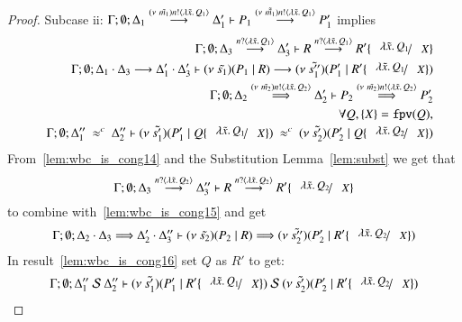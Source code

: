 \begin{proof}
	\noi Subcase ii: $\Gamma; \emptyset; \Delta_1 \stackrel{(\nu\ \tilde{m_1}) n ! \langle \lambda \tilde{x}.\,Q_1 \rangle}{\longrightarrow} \Delta_1' \vdash P_1 \stackrel{(\nu\ \tilde{\tilde{m_1}}) n ! \langle \lambda \tilde{x}.\,Q_1 \rangle}{\longrightarrow} P_1'$ implies
%
	\begin{eqnarray}
		& & \Gamma; \emptyset; \Delta_3 \by{\bactinp{n}{\abs{\tilde{x}} {Q_1}}} \Delta_3' \proves R \by{\bactinp{n}{\abs{\tilde{x}} {Q_1}}} R' \subst{\abs{\tilde{x}}{Q_1}}{X}
		\label{lem:wbc_is_cong14}\\
		& & \Gamma; \emptyset; \Delta_1 \cat \Delta_3 \by{} \Delta_1' \cat \Delta_3' \proves \newsp{\tilde{s_1}}{P_1 \Par R} \by{} \newsp{\tilde{s_1''}}{P_1' \Par R' \subst{\abs{\tilde{x}}{Q_1}}{X}} \nonumber \\
		& & \Gamma; \emptyset; \Delta_2\By{\news{\tilde{m_2}} \bactout{n}{\abs{\tilde{x}}{Q_2}}} \Delta_2' \proves P_2 \By{\news{\tilde{m_2}} \bactout{n}{\abs{\tilde{x}}{Q_2}}} P_2'
		\label{lem:wbc_is_cong15}\\
		& & \forall Q, \set{X} = \fpv{Q}, \nonumber \\
		& & \Gamma; \emptyset; \Delta_1''\ \wbc\ \Delta_2'' \proves \newsp{\tilde{s_1'}}{P_1' \Par Q \subst{\abs{\tilde{x}}{Q_1}}{X}}\ \wbc\ \newsp{\tilde{s_2'}}{P_2' \Par Q \subst{\abs{\tilde{x}}{Q_2}}{X}} \label{lem:wbc_is_cong16}
	\end{eqnarray}
%
	From~\ref{lem:wbc_is_cong14} and the Substitution Lemma~\ref{lem:subst} we get that
	\[
		\Gamma; \emptyset; \Delta_3 \by{\bactinp{n}{\abs{\tilde{x}} {Q_2}}} \Delta_3'' \proves R \by{\bactinp{n}{\abs{\tilde{x}} {Q_2}}} R' \subst{\abs{\tilde{x}}{Q_2}}{X}
	\]
	\noi to combine with~\ref{lem:wbc_is_cong15} and get
	\[
		\Gamma; \emptyset; \Delta_2 \cat \Delta_3 \By{} \Delta_2' \cat \Delta_3'' \proves \newsp{\tilde{s_2}}{P_2 \Par R} \By{} \newsp{\tilde{s_2''}}{P_2' \Par R' \subst{\abs{\tilde{x}}{Q_2}}{X}}
	\]
%
	\noi In result~\ref{lem:wbc_is_cong16} set $Q$ as $R'$ to get:
%
	\[
		\Gamma; \emptyset; \Delta_1''\ \mathcal{S}\ \Delta_2'' \proves \newsp{\tilde{s_1'}}{P_1' \Par R' \subst{\abs{\tilde{x}}{Q_1}}{X}}\ \mathcal{S}\ \newsp{\tilde{s_2'}}{P_2' \Par R' \subst{\abs{\tilde{x}}{Q_2}}{X}}
	\]


\end{proof}
